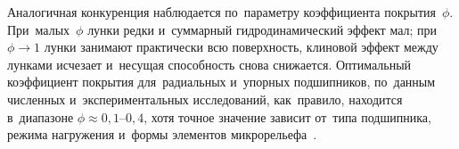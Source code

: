 Аналогичная конкуренция наблюдается по~параметру коэффициента покрытия~$\phi$. При~малых~$\phi$ лунки редки и~суммарный гидродинамический эффект мал; при~$\phi \to 1$ лунки занимают практически всю поверхность, клиновой эффект между лунками исчезает и~несущая способность снова снижается. Оптимальный коэффициент покрытия для~радиальных и~упорных подшипников, по~данным численных и~экспериментальных исследований, как~правило, находится в~диапазоне $\phi \approx 0{,}1$--$0{,}4$, хотя точное значение зависит от~типа подшипника, режима нагружения и~формы элементов микрорельефа~\cite{senatore2018}.
